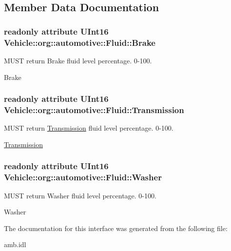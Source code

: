 \subsection{Member Data Documentation}
\hypertarget{interfaceVehicle_1_1org_1_1automotive_1_1Fluid_af87901cbef12663090e0eb952caff3ad}{
\subsubsection[{Brake}]{\setlength{\rightskip}{0pt plus 5cm}readonly attribute U\-Int16 Vehicle\-::org\-::automotive\-::\-Fluid\-::\-Brake}}\label{interfaceVehicle_1_1org_1_1automotive_1_1Fluid_af87901cbef12663090e0eb952caff3ad}


M\-U\-S\-T return Brake fluid level percentage. 0-\/100. 

Brake \hypertarget{interfaceVehicle_1_1org_1_1automotive_1_1Fluid_ad5c508a2122623f20227b95b4f67dd85}{
\subsubsection[{Transmission}]{\setlength{\rightskip}{0pt plus 5cm}readonly attribute U\-Int16 Vehicle\-::org\-::automotive\-::\-Fluid\-::\-Transmission}}\label{interfaceVehicle_1_1org_1_1automotive_1_1Fluid_ad5c508a2122623f20227b95b4f67dd85}


M\-U\-S\-T return \hyperlink{interfaceVehicle_1_1org_1_1automotive_1_1Transmission}{Transmission} fluid level percentage. 0-\/100. 

\hyperlink{interfaceVehicle_1_1org_1_1automotive_1_1Transmission}{Transmission} \hypertarget{interfaceVehicle_1_1org_1_1automotive_1_1Fluid_a71da44ddb1ffff3ac8bb986641b5780e}{
\subsubsection[{Washer}]{\setlength{\rightskip}{0pt plus 5cm}readonly attribute U\-Int16 Vehicle\-::org\-::automotive\-::\-Fluid\-::\-Washer}}\label{interfaceVehicle_1_1org_1_1automotive_1_1Fluid_a71da44ddb1ffff3ac8bb986641b5780e}


M\-U\-S\-T return Washer fluid level percentage. 0-\/100. 

Washer 

The documentation for this interface was generated from the following file\-:\begin{DoxyCompactItemize}
\item 
amb.\-idl\end{DoxyCompactItemize}
